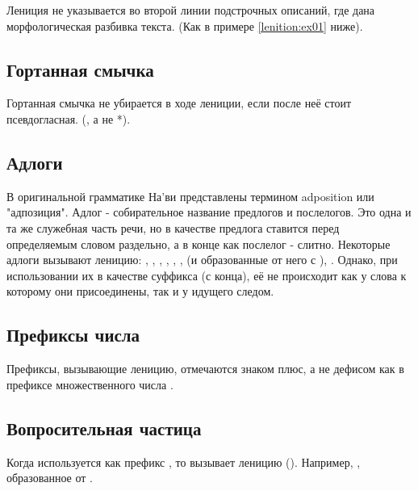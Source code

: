 \noindent Лениция не указывается во второй линии подстрочных описаний, где дана морфологическая разбивка текста. (Как в примере \ref{lenition:ex01} ниже). 

\subsection{Гортанная смычка} Гортанная смычка не убирается в ходе лениции, если после неё стоит псевдогласная. (, а не *).
\label{l-and-s:lenition:pseudovowel}

\subsection{Адлоги} В оригинальной грамматике На'ви представлены термином adposition или "адпозиция". Адлог - собирательное название предлогов и послелогов. Это одна и та же служебная часть речи, но в качестве предлога ставится перед определяемым словом раздельно, а в конце как послелог - слитно. Некоторые адлоги вызывают леницию: , , , , , ,
 (и образованные от него  с ), . Однако, при использовании их в качестве суффикса (с конца), её не происходит как у слова к которому они присоединены, так и у идущего следом.

\subsection{Префиксы числа} Префиксы, вызывающие леницию, отмечаются знаком плюс, а не дефисом как в префиксе множественного числа . 

\subsection{Вопросительная частица} Когда используется как префикс , то вызывает леницию (). Например,  , образованное от  .

